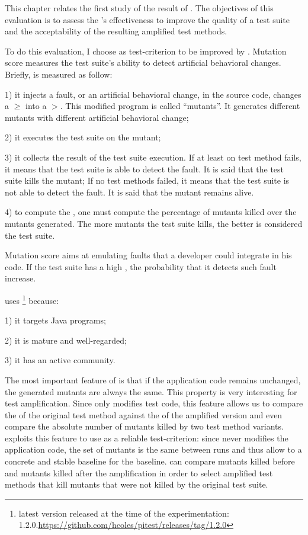 This chapter relates the first study of the result of \dspot.
The objectives of this evaluation is to assess the \dspot's effectiveness to improve the quality of a test suite and the acceptability of the resulting amplified test methods.

To do this evaluation, I choose \ms as test-criterion to be improved by \dspot.
Mutation score measures the test suite's ability to detect artificial behavioral changes.
Briefly, \ms is measured as follow:

1) it injects a fault, or an artificial behavioral change, in the source code, \eg changes a $\ge$ into a $>$.
This modified program is called ``mutants''.
It generates different mutants with different artificial behavioral change;

2) it executes the test suite on the mutant;

3) it collects the result of the test suite execution.
If at least on test method fails, it means that the test suite is able to detect the fault.
It is said that the test suite kills the mutant;
If no test methods failed, it means that the test suite is not able to detect the fault. 
It is said that the mutant remains alive.

4) to compute the \ms, one must compute the percentage of mutants killed over the mutants generated.
The more mutants the test suite kills, the better is considered the test suite.

Mutation score aims at emulating faults that a developer could integrate in his code.
If the test suite has a high \ms, the probability that it detects such fault increase.

\dspot uses \pitest\cite{coles_pit_2016} \footnote{latest version released at the time of the experimentation: 1.2.0.\url{https://github.com/hcoles/pitest/releases/tag/1.2.0}} because: 

1) it targets Java programs;

2) it is mature and well-regarded;

3) it has an active community.

The most important feature of \pitest is that if the application code remains unchanged, the generated mutants are always the same.
This property is very interesting for test amplification.
Since \dspot only modifies test code, this feature allows us to compare the \ms of the original test method against the \ms of the amplified version and even compare the absolute number of mutants killed by two test method variants. 
\dspot exploits this feature to use \ms as a reliable test-criterion:
since \dspot never modifies the application code, the set of mutants is the same between runs and thus allow \dspot to a concrete and stable baseline for the baseline.
\dspot can compare mutants killed before and mutants killed after the amplification in order to select amplified test methods that kill mutants that were not killed by the original test suite.

